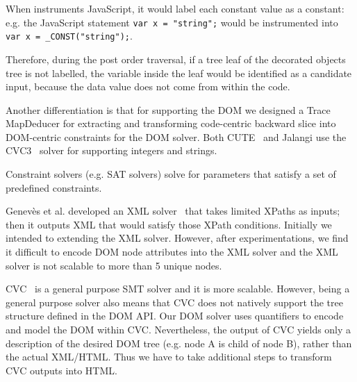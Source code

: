 When \tool instruments JavaScript, it would label each constant value as a constant: e.g. the JavaScript statement {\tt var x = "string";} would be instrumented into {\tt var x = \_CONST("string");}.
  
Therefore, during the post order traversal, if a tree leaf of the decorated objects tree is not labelled, the variable inside the leaf would be identified as a candidate input, because the data value does not come from within the code.  

Another differentiation is that for supporting the DOM we designed a Trace MapDeducer for extracting and transforming code-centric backward slice into DOM-centric constraints for the DOM solver.  
Both CUTE~\cite{cute} and Jalangi use the CVC3~\cite{cvc3} solver for supporting integers and strings.  





Constraint solvers (e.g. SAT solvers) solve for parameters that satisfy a set of predefined constraints.  

Genev\`{e}s et al. developed an XML solver~\cite{xmlsolver} that takes limited XPaths as inputs; then it outputs XML that would satisfy those XPath conditions. 
Initially we intended to extending the XML solver.  However, after experimentations, we find it difficult to encode DOM node attributes into the XML solver and the XML solver is not scalable to more than 5 unique nodes. 

CVC~\cite{cvc3, cvc4} is a general purpose SMT solver and it is more scalable.  However, being a general purpose solver also means that CVC does not natively support the tree structure defined in the DOM API.  
Our DOM solver uses quantifiers to encode and model the DOM within CVC.  Nevertheless, the output of CVC yields only a description of the desired DOM tree (e.g. node A is child of node B), rather than the actual XML/HTML. 
Thus we have to take additional steps to transform CVC outputs into HTML.


